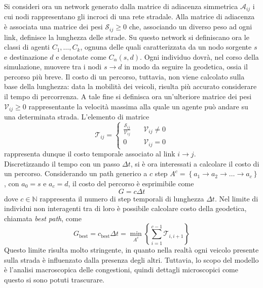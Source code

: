 \documentclass[../main.tex]{subfiles}
\begin{document}
Si consideri ora un network generato dalla matrice di adiacenza simmetrica $\mathcal{A}_{ij}$ i cui nodi rappresentano gli incroci di una rete stradale.
Alla matrice di adiacenza \`e associata una matrice dei pesi $\mathcal{S}_{ij} \geq 0$ che, associando un diverso peso ad ogni link, definisce la lunghezza delle strade.
Su questo network si definiscano ora le classi di agenti $C_{1},\ldots,C_{k}$, ognuna delle quali caratterizzata da un nodo sorgente $s$ e destinazione $d$ e denotate come $C_{\alpha}(s,d)$.
Ogni individuo dovr\`a, nel corso della simulazione, muovere tra i nodi $s\to d$ in modo da seguire la geodetica, ossia il percorso pi\`u breve.
Il costo di un percorso, tuttavia, non viene calcolato sulla base della lunghezza: data la mobilit\`a dei veicoli, risulta pi\`u accurato considerare il tempo di percorrenza.
A tale fine si definisca ora un'ulteriore matrice dei pesi $\mathcal{V}_{ij} \geq 0$ rappresentante la velocit\`a massima alla quale un agente pu\`o andare su una determinata strada.
L'elemento di matrice
\begin{equation}
    \mathcal{T}_{ij}=
    \begin{cases}
        \frac{\mathcal{S}_{ij}}{\mathcal{V}_{ij}} \quad& \mathcal{V}_{ij} \neq 0\\
        0 \quad& \mathcal{V}_{ij} = 0
    \end{cases}
\end{equation}
rappresenta dunque il costo temporale associato al link $i \to j$.\\
Discretizzando il tempo con un passo $\Delta t$, si \`e ora interessati a calcolare il costo di un percorso.
Considerando un path generico a $c$ step $A^{c} = \left\{a_{1} \to a_{2} \to \ldots \to a_{c}\right\}$, con $a_{0} = s$ e $a_{c} = d$, il costo del percorso \`e esprimibile come
\begin{equation}
    G=c\Delta t
\end{equation}
dove $c \in \mathbb{N}$ rappresenta il numero di step temporali di lunghezza $\Delta t$.
Nel limite di individui non interagenti tra di loro \`e possibile calcolare costo della geodetica, chiamata \emph{best path}, come
\begin{equation}
    G_{\text{best}} = c_{\text{best}}\Delta t = \min_{A^{c}} \left\{\sum_{i=1}^{c-1}\mathcal{T}_{i,i+1}\right\}
    \label{eq:best_path}
\end{equation}
Questo limite risulta molto stringente, in quanto nella realt\`a ogni veicolo presente sulla strada \`e influenzato dalla presenza degli altri.
Tuttavia, lo scopo del modello \`e l'analisi macroscopica delle congestioni, quindi dettagli microscopici come questo si sono potuti trascurare.
\end{document}
